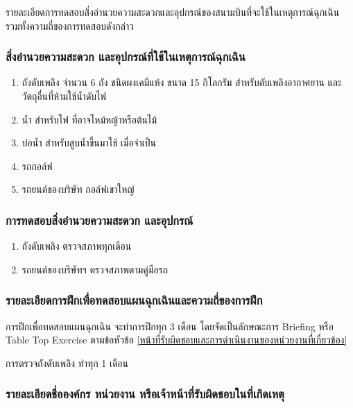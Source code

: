 รายละเอียดการทดสอบสิ่งอำนวยความสะดวกและอุปกรณ์ของสนามบินที่จะใช้ในเหตุการณ์ฉุกเฉิน รวมทั้งความถี่ของการทดสอบดังกล่าว

\subsubsection{สิ่งอำนวยความสะดวก และอุปกรณ์ที่ใช้ในเหตุการณ์ฉุกเฉิน}

\begin{enumerate}
\item ถังดับเพลิง จำนวน 6 ถัง ชนิดผงเคมีแห้ง ขนาด 15 กิโลกรัม สำหรับดับเพลิงอากาศยาน และวัตถุอื่นที่ห้ามใช้น้ำดับไฟ
\item น้ำ สำหรับไฟ ที่อาจไหม้หญ้าหรือต้นไม้
\item บ่อน้ำ สำหรับสูบน้ำขึ้นมาใช้ เมื่อจำเป็น
\item รถกอล์ฟ
\item รถยนต์ของบริษัท กอล์ฟเขาใหญ่
\end{enumerate}


\subsubsection{การทดสอบสิ่งอำนวยความสะดวก และอุปกรณ์}

\begin{enumerate}
\item ถังดับเพลิง ตรวจสภาพทุกเดือน
\item รถยนต์ของบริษัทฯ ตรวจสภาพตามคู่มือรถ
\end{enumerate}

\subsubsection{รายละเอียดการฝึกเพื่อทดสอบแผนฉุกเฉินและความถี่ของการฝึก}

การฝึกเพื่อทดสอบแผนฉุกเฉิน จะทำการฝึกทุก 3 เดือน โดยจัดเป็นลักษณะการ Briefing หรือ Table Top Exercise ตามข้อหัวข้อ \ref{หน้าที่รับผิดชอบและการดำเนินงานของหน่วยงานที่เกี่ยวข้อง}

การตรวจถังดับเพลิง ทำทุก 1 เดือน

\subsubsection{รายละเอียดชื่อองค์กร หน่วยงาน หรือเจ้าหน้าที่รับผิดชอบในที่เกิดเหตุ} 


